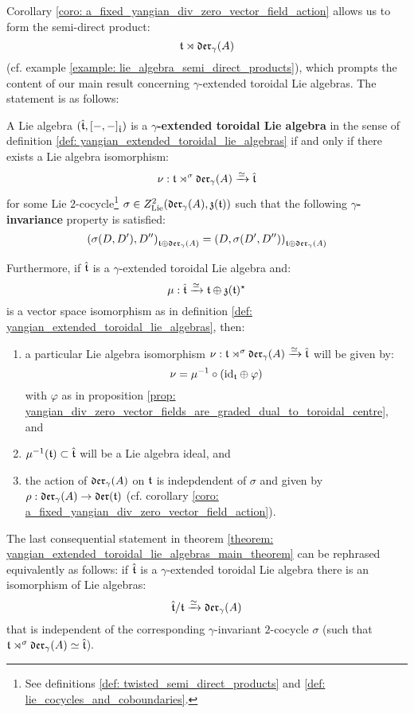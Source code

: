         Corollary \ref{coro: a_fixed_yangian_div_zero_vector_field_action} allows us to form the semi-direct product:
            $$\mathfrak{t} \rtimes \mathfrak{der}_{\gamma}(A)$$
        (cf. example \ref{example: lie_algebra_semi_direct_products}), which prompts the content of our main result concerning $\gamma$-extended toroidal Lie algebras. The statement is as follows:
        \begin{theorem} \label{theorem: yangian_extended_toroidal_lie_algebras_main_theorem}
            A Lie algebra $(\hat{\mathfrak{t}}, [-, -]_{\hat{\mathfrak{t}}})$ is a \textbf{$\gamma$-extended toroidal Lie algebra} in the sense of definition \ref{def: yangian_extended_toroidal_lie_algebras} if and only if there exists a Lie algebra isomorphism:
                $$\nu: \mathfrak{t} \rtimes^{\sigma} \mathfrak{der}_{\gamma}(A) \xrightarrow[]{\simeq} \hat{\mathfrak{t}}$$
            for some Lie $2$-cocycle\footnote{See definitions \ref{def: twisted_semi_direct_products} and \ref{def: lie_cocycles_and_coboundaries}.} $\sigma \in Z^2_{\mathrm{Lie}}(\mathfrak{der}_{\gamma}(A), \mathfrak{z}(\mathfrak{t}))$ such that the following \textbf{$\gamma$-invariance} property is satisfied:
                $$\left( \sigma(D, D'), D'' \right)_{\mathfrak{t} \oplus \mathfrak{der}_{\gamma}(A)} = \left( D, \sigma(D', D'') \right)_{\mathfrak{t} \oplus \mathfrak{der}_{\gamma}(A)}$$
                
            Furthermore, if $\hat{\mathfrak{t}}$ is a $\gamma$-extended toroidal Lie algebra and:
                $$\mu: \hat{\mathfrak{t}} \xrightarrow[]{\simeq} \mathfrak{t} \oplus \mathfrak{z}(\mathfrak{t})^{\star}$$
            is a vector space isomorphism as in definition \ref{def: yangian_extended_toroidal_lie_algebras}, then:
            \begin{enumerate}
                \item a particular Lie algebra isomorphism $\nu: \mathfrak{t} \rtimes^{\sigma} \mathfrak{der}_{\gamma}(A) \xrightarrow[]{\simeq} \hat{\mathfrak{t}}$ will be given by:
                    $$\nu = \mu^{-1} \circ (\mathrm{id}_{\mathfrak{t}} \oplus \varphi)$$
                with $\varphi$ as in proposition \ref{prop: yangian_div_zero_vector_fields_are_graded_dual_to_toroidal_centre}, and
                \item $\mu^{-1}(\mathfrak{t}) \subset \hat{\mathfrak{t}}$ will be a Lie algebra ideal, and
                \item the action of $\mathfrak{der}_{\gamma}(A)$ on $\mathfrak{t}$ is indepdendent of $\sigma$ and given by $\rho: \mathfrak{der}_{\gamma}(A) \to \mathfrak{der}(\mathfrak{t})$ (cf. corollary \ref{coro: a_fixed_yangian_div_zero_vector_field_action}).
            \end{enumerate}
        \end{theorem}
        \begin{remark}
            The last consequential statement in theorem \ref{theorem: yangian_extended_toroidal_lie_algebras_main_theorem} can be rephrased equivalently as follows: if $\hat{\mathfrak{t}}$ is a $\gamma$-extended toroidal Lie algebra there is an isomorphism of Lie algebras:
                $$\hat{\mathfrak{t}}/\mathfrak{t} \xrightarrow[]{\simeq} \mathfrak{der}_{\gamma}(A)$$
            that is independent of the corresponding $\gamma$-invariant $2$-cocycle $\sigma$ (such that $\mathfrak{t} \rtimes^{\sigma} \mathfrak{der}_{\gamma}(A) \simeq \hat{\mathfrak{t}}$).
        \end{remark}
        
